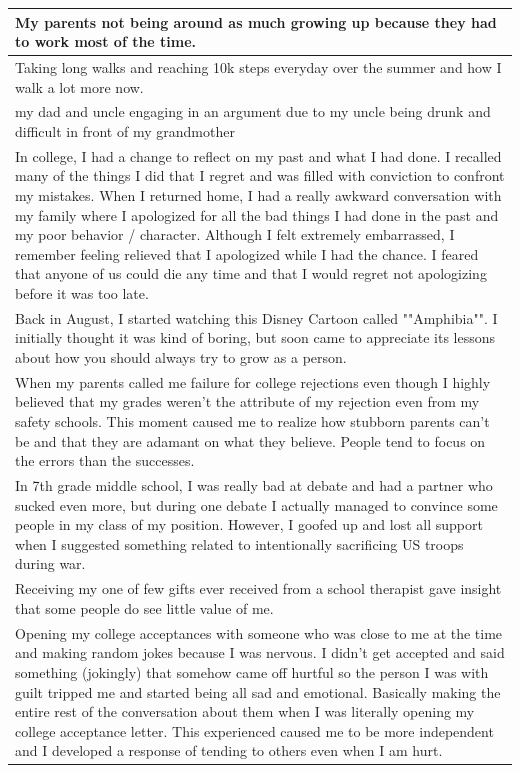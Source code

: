 \documentclass[
  .7em,
  letterpaper,
  DIV=11,
  numbers=noendperiod]{scrartcl}
\begin{document}
\begin{table}
\begin{tabular}{l}
\hline
My parents not being around as much growing up because they had to work most of the time.\\
\hline
Taking long walks and reaching 10k steps everyday over the summer and how I walk a lot more now.\\
\hline
my dad and uncle engaging in an argument due to my uncle being drunk and difficult in front of my grandmother\\
\hline
In college, I had a change to reflect on my past and what I had done. I recalled many of the things I did that I regret and was filled with conviction to confront my mistakes. When I returned home, I had a really awkward conversation with my family where I apologized for all the bad things I had done in the past and my poor behavior / character. Although I felt extremely embarrassed, I remember feeling relieved that I apologized while I had the chance. I feared that anyone of us could die any time and that I would regret not apologizing before it was too late.\\
\hline
Back in August, I started watching this Disney Cartoon called ""Amphibia"". I initially thought it was kind of boring, but soon came to appreciate its lessons about how you should always try to grow as a person.\\
\hline
When my parents called me failure for college rejections even though I highly believed that my grades weren't the attribute of my rejection even from my safety schools. This moment caused me to realize how stubborn parents can't be and that they are adamant on what they believe. People tend to focus on the errors than the successes.\\
\hline
In 7th grade middle school, I was really bad at debate and had a partner who sucked even more, but during one debate I actually managed to convince some people in my class of my position. However, I goofed up and lost all support when I suggested something related to intentionally sacrificing US troops during war.\\
\hline
Receiving my one of few gifts ever received from a school therapist gave insight that some people do see little value of me.\\
\hline
Opening my college acceptances with someone who was close to me at the time and making random jokes because I was nervous. I didn't get accepted and said something (jokingly) that somehow came off hurtful so the person I was with guilt tripped me and started being all sad and emotional. Basically making the entire rest of the conversation about them when I was literally opening my college acceptance letter. This experienced caused me to be more independent and I developed a response of tending to others even when I am hurt.\\

\end{tabular}
\end{table}
\end{document}
